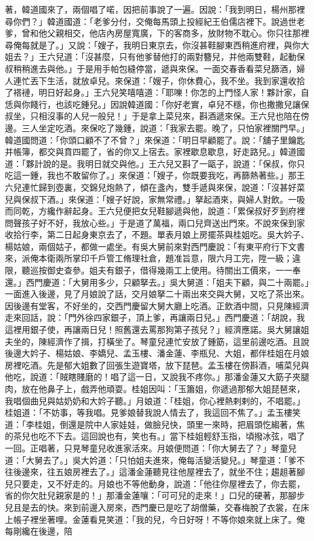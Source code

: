 著，韓道國來了，兩個唱了喏，因把前事說了一遍。因說：「我到明日，楊州那裡尋你們？」韓道國道：「老爹分付，交俺每馬頭上投經紀王伯儒店裡下。說過世老爹，曾和他父親相交，他店內房屋寬廣，下的客商多，放財物不耽心。你只往那裡尋俺每就是了。」又說：「嫂子，我明日東京去，你沒甚鞋腳東西稍進府裡，與你大姐去？」王六兒道：「沒甚麼，只有他爹替他打的兩對簪兒，并他兩雙鞋，起動保叔稍稍進去與他。」于是用手帕包縫停當，遞與來保。一面交春香看菜兒篩酒，婦人連忙丟下生活，就放卓兒。來保道：「嫂子，你休費心，我不坐。我到家還收拾了褡褳，明日好起身。」王六兒笑嘻嘻道：「耶嚛！你怎的上門怪人家！夥計家，自恁與你餞行，也該吃鍾兒。」因說韓道國：「你好老實，卓兒不穩，你也撒撒兒讓保叔坐，只相沒事的人兒一般兒！」于是拿上菜兒來，斟酒遞來保。王六兒也陪在傍邊。三人坐定吃酒。來保吃了幾鍾，說道：「我家去罷。晚了，只怕家裡關門早。」韓道國問道：「你頭口顧不了不曾？」來保道：「明日早顧罷了。說：「舖子里鑰匙并帳簿，都交與賁四罷了，省的你又上宿去。家裡歇息歇息，好走路兒。」韓道國道：「夥計說的是。我明日就交與他。」王六兒又斟了一甌子，說道：「保叔，你只吃這一鍾，我也不敢留你了。」來保道：「嫂子，你既要我吃，再篩熱著些。」那王六兒連忙歸到壺裏，交錦兒炮熱了，傾在盞內，雙手遞與來保，說道：「沒甚好菜兒與保叔下酒。」來保道：「嫂子好說，家無常禮。」拏起酒來，與婦人對飲。一吸而同乾，方纔作辭起身。王六兒便把女兒鞋腳遞與他，說道：「累保叔好歹到府裡問聲孩子好不好，我放心些。」于是道了萬福，兩口兒齊送出門來。不說來保到家收拾行李，第二日起身東京去了，不題。單表月娘上房擺茶與桂姐吃。吳大妗子、楊姑娘，兩個姑子，都做一處坐。有吳大舅前來對西門慶說：「有東平府行下文書來，派俺本衛兩所掌印千戶管工脩理社倉，題准旨意，限六月工完，陞一級；違限，聽巡按御史查參。姐夫有銀子，借得幾兩工上使用。待關出工價來，一一奉還。」西門慶道：「大舅用多少，只顧拏去。」吳大舅道：「姐夫下顧，與二十兩罷。」一面進入後邊，見了月娘說了話，交月娘拏二十兩出來交與大舅，又吃了茶出來。因後邊有堂客，不好坐的，交西門慶留大舅大廳上吃酒。正飲酒中間，只見陳經濟走來回話，說：「門外徐四家銀子，頂上爹，再讓兩日兒。」西門慶道：「胡說，我這裡用銀子使，再讓兩日兒！照舊還去罵那狗第子孩兒？」經濟應諾。吳大舅讓姐夫坐的，陳經濟作了揖，打橫坐了。琴童兒連忙安放了鍾筯，這里前邊吃酒。且說後邊大妗子、楊姑娘、李嬌兒、孟玉樓、潘金蓮、李瓶兒、大姐，都伴桂姐在月娘房裡吃酒。先是郁大姐數了回張生遊寶塔，放下琵琶。孟玉樓在傍斟酒，哺菜兒與他吃，說道：「賊瞎賤磨的！唱了這一日，又說我不疼你。」那潘金蓮又大筯子夾腿肉，放在他鼻子上，戲弄他頑耍。桂姐因叫：「玉簫姐，你遞過那郁大姐琵琶來，我唱個曲兒與姑奶奶和大妗子聽。」月娘道：「桂姐，你心裡熱剌剌的，不唱罷。」桂姐道：「不妨事，等我唱。見爹娘替我說人情去了，我這回不焦了。」孟玉樓笑道：「李桂姐，倒還是院中人家娃娃，做臉兒快，頭里一來時，把眉頭忔縐著，焦的茶兒也吃不下去。這回說也有，笑也有。」當下桂姐輕舒玉指，頃撥冰弦，唱了一回。正唱著，只見琴童兒收進家活來。月娘便問道：「你大舅去了？」琴童兒道：「大舅去了。」吳大妗道：「只怕姐夫進來，俺每活變活變兒。」琴童道：「爹不往後邊來，往五娘房裡去了。」這潘金蓮聽見往他屋裡去了，就坐不住；趨趄著腳兒只要走，又不好走的。月娘也不等他動身，說道：「他往你屋裡去了，你去罷，省的你欠肚兒親家是的！」那潘金蓮嚷：「可可兒的走來！」口兒的硬著，那腳步兒且是去的快。來到前邊入房來，西門慶已是吃了胡僧藥，交春梅脫了衣裳，在床上帳子裡坐著哩。金蓮看見笑道：「我的兒，今日好呀！不等你娘來就上床了。俺每剛纔在後邊，陪